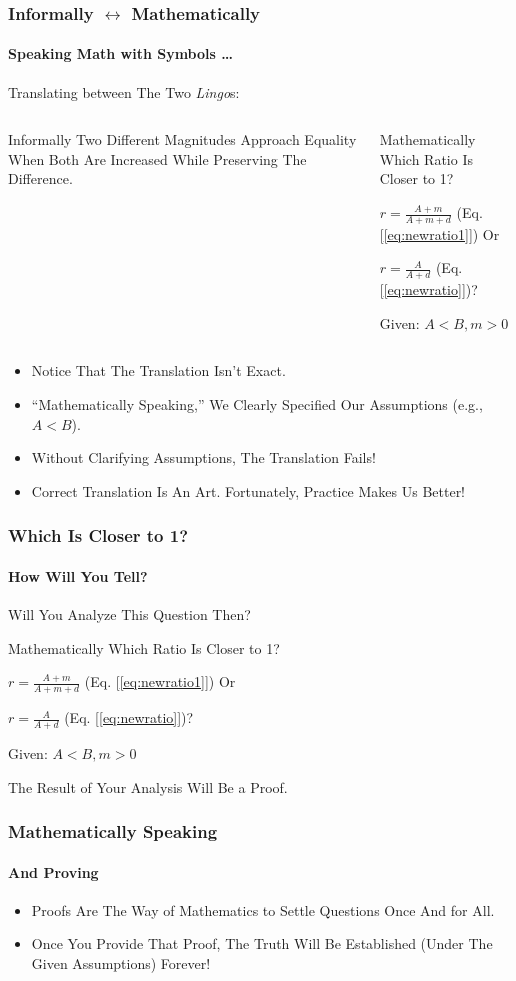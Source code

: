 \documentclass{beamer}
\begin{document}
\begin{frame}
\frametitle{Informally $\leftrightarrow$ Mathematically}
\framesubtitle{Speaking Math with Symbols \dots}
\label{slide:informalmathematical}
Translating between The Two \textit{Lingo}s:

\begin{columns}[t]
\begin{block}{Informally}
Two Different Magnitudes \alert{Approach Equality} When Both Are Increased While Preserving The Difference.
\end{block}
\pause
{}
\begin{block}{Mathematically}
Which \alert{Ratio Is Closer to 1}? 

$r=\frac{A+m}{A+m+d}$ (Eq. [\ref{eq:newratio1}]) Or 

$r=\frac{A}{A+d}$ (Eq. [\ref{eq:newratio}])?

Given: $A<B, m>0$
\end{block}
\end{columns}
\begin{itemize}
\pause
\item Notice That The Translation \alert{Isn't Exact}.
\pause
\item ``Mathematically Speaking,'' We Clearly Specified Our Assumptions (\alert{e.g., $A<B$}).
\pause
\item Without Clarifying Assumptions, The Translation Fails!
\pause
\item Correct Translation Is An Art. Fortunately, Practice Makes Us Better!
\end{itemize}
\end{frame}

\begin{frame}
\frametitle{Which Is Closer to 1?}
\framesubtitle{How Will You Tell?}
\label{slide:whichiscloserto1}
Will You Analyze This Question Then?
\pause
\begin{block}{Mathematically}
Which \alert{Ratio Is Closer to 1}? 

$r=\frac{A+m}{A+m+d}$ (Eq. [\ref{eq:newratio1}]) Or 

$r=\frac{A}{A+d}$ (Eq. [\ref{eq:newratio}])?

Given: $A<B, m>0$
\end{block}
\pause
The Result of Your Analysis Will Be a \alert{Proof}.
\end{frame}

\begin{frame}
\frametitle{Mathematically Speaking}
\framesubtitle{And Proving}
\label{slide:whyspeakmathematically}

\begin{itemize}
\pause
\item
\alert{Proofs} Are The Way of Mathematics to Settle Questions Once And for All.
\pause
\item Once You Provide That Proof, The Truth Will Be Established (Under The Given Assumptions) Forever!
\end{itemize}
\end{frame}
\end{document}
